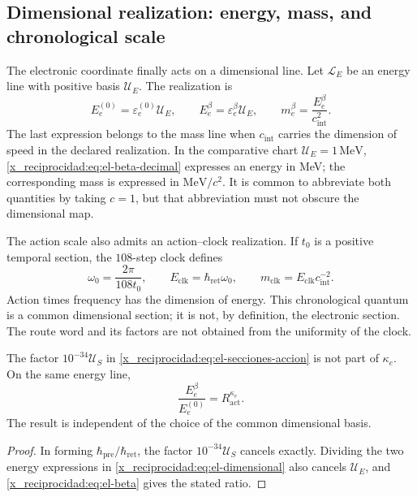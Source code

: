 \subsection{Dimensional realization: energy, mass, and chronological scale}

The electronic coordinate finally acts on a dimensional line.
Let \(\mathcal L_E\) be an energy line with positive basis
\(\mathcal U_E\). The realization is
\begin{equation}
 E_e^{(0)}=\varepsilon_e^{(0)}\mathcal U_E,\qquad
 E_e^\beta=\varepsilon_e^\beta\mathcal U_E,
 \qquad m_e^\beta=\frac{E_e^\beta}{c_{\mathrm{int}}^2}.
 \label{x_reciprocidad:eq:el-dimensional}
\end{equation}
The last expression belongs to the mass line when
\(c_{\mathrm{int}}\) carries the dimension of speed in the declared
realization. In the comparative chart \(\mathcal U_E=1\,\mathrm{MeV}\),
\eqref{x_reciprocidad:eq:el-beta-decimal} expresses an energy in MeV; the corresponding
mass is expressed in \(\mathrm{MeV}/c^2\). It is common
to abbreviate both quantities by taking \(c=1\), but that abbreviation must not
obscure the dimensional map.

The action scale also admits an action--clock realization. If
\(t_0\) is a positive temporal section, the \(108\)-step clock
defines
\begin{equation}
 \omega_0=\frac{2\pi}{108t_0},\qquad
 E_{\mathrm{clk}}=\hbar_{\mathrm{ret}}\omega_0,\qquad
 m_{\mathrm{clk}}=E_{\mathrm{clk}}c_{\mathrm{int}}^{-2}.
 \label{x_reciprocidad:eq:el-cuanto-reloj}
\end{equation}
Action times frequency has the dimension of energy. This chronological
quantum is a common dimensional section; it is not, by definition,
the electronic section. The route word and its factors are not
obtained from the uniformity of the clock.

\begin{proposition}
The factor \(10^{-34}\mathcal U_S\) in
\eqref{x_reciprocidad:eq:el-secciones-accion} is not part of \(\kappa_e\). On
the same energy line,
\begin{equation}
 \frac{E_e^\beta}{E_e^{(0)}}=R_{\mathrm{act}}^{\kappa_e}.
 \label{x_reciprocidad:eq:el-razon-energia}
\end{equation}
The result is independent of the choice of the common dimensional
basis.
\end{proposition}
\begin{proof}
In forming \(\hbar_{\mathrm{pre}}/\hbar_{\mathrm{ret}}\), the factor
\(10^{-34}\mathcal U_S\) cancels exactly. Dividing the two
energy expressions in \eqref{x_reciprocidad:eq:el-dimensional} also cancels
\(\mathcal U_E\), and \eqref{x_reciprocidad:eq:el-beta} gives the stated ratio.
\end{proof}


